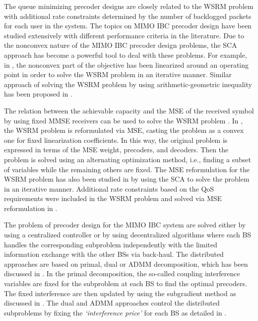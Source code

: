 The queue minimizing precoder designs are closely related to the \ac{WSRM} problem with additional rate constraints determined by the number of backlogged packets for each user in the system. The topics on \ac{MIMO} \ac{IBC} precoder design have been studied extensively with different performance criteria in the literature. Due to the nonconvex nature of the \ac{MIMO} \ac{IBC} precoder design problems, the \ac{SCA} approach has become a powerful tool to deal with these problems. For example, in \cite{sin_algorithm}, the nonconvex part of the objective has been linearized around an operating point in order to solve the \ac{WSRM} problem in an iterative manner. Similar approach of solving the \ac{WSRM} problem by using arithmetic-geometric inequality has been proposed in \cite{tran2012fast}.

The relation between the achievable capacity and the \ac{MSE} of the received symbol by using fixed \ac{MMSE} receivers can be used to solve the \ac{WSRM} problem \cite{mse_duality}. In \cite{christensen2008weighted,wmmse_shi}, the \ac{WSRM} problem is reformulated via \ac{MSE}, casting the problem as a convex one for fixed linearization coefficients. In this way, the original problem is expressed in terms of the \ac{MSE} weight, precoders, and decoders. Then the problem is solved using an alternating optimization method, i.e., finding a subset of variables while the remaining others are fixed. The \ac{MSE} reformulation for the \ac{WSRM} problem has also been studied in \cite{hong2012decomposition} by using the \ac{SCA} to solve the problem in an iterative manner. Additional rate constraints based on the \ac{QoS} requirements were included in the \ac{WSRM} problem and solved via \ac{MSE} reformulation in \cite{kaleva2013primal,kaleva2013decentralized}.

The problem of precoder design for the \ac{MIMO} \ac{IBC} system are solved either by using a centralized controller or by using decentralized algorithms where each \ac{BS} handles the corresponding subproblem independently with the limited information exchange with the other \acp{BS} via back-haul. The distributed approaches are based on primal, dual or \ac{ADMM} decomposition, which has been discussed in \cite{palomar2006tutorial,boyd2011distributed}. In the  primal decomposition, the so-called coupling interference variables are fixed for the subproblem at each \ac{BS} to find the optimal precoders. The fixed interference are then updated by using the subgradient method as discussed in \cite{pennanen2011decentralized}. The dual and \ac{ADMM} approaches control the distributed subproblems by fixing the \emph{`interference price'} for each \ac{BS} as detailed in \cite{tolli2011decentralized}.


